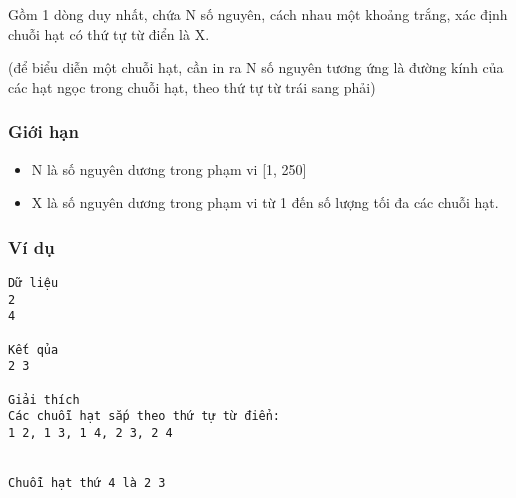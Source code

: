    Gồm 1 dòng duy nhất, chứa N số nguyên, cách nhau một khoảng trắng, xác định chuỗi hạt có thứ tự từ điển là X.  

   (để biểu diễn một chuỗi hạt, cần in ra N số nguyên tương ứng là đường kính của các hạt ngọc trong chuỗi hạt, theo thứ tự từ trái sang phải)  

\subsubsection{   Giới hạn  }
\begin{itemize}
	\item     N là số nguyên dương trong phạm vi [1, 250]   
	\item     X là số nguyên dương trong phạm vi từ 1 đến số lượng tối đa các chuỗi hạt.   
\end{itemize}

\subsubsection{   Ví dụ  }
\begin{verbatim}
Dữ liệu
2
4

Kết qủa
2 3

Giải thích
Các chuỗi hạt sắp theo thứ tự từ điển:
1 2, 1 3, 1 4, 2 3, 2 4


Chuỗi hạt thứ 4 là 2 3

\end{verbatim}